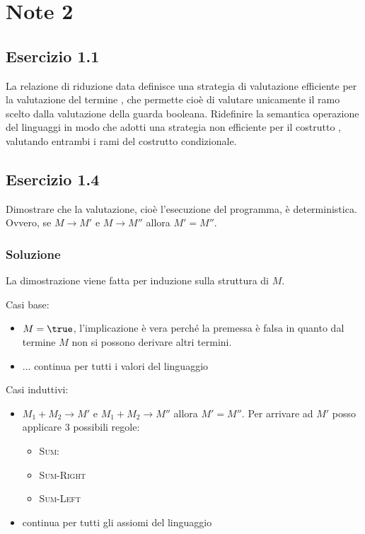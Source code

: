 
\section{Note 2}

\subsection{Esercizio 1.1}

La relazione di riduzione data definisce una strategia di valutazione efficiente per la valutazione del termine , che permette cioè di valutare unicamente il ramo scelto dalla valutazione della guarda booleana. Ridefinire la semantica operazione del linguaggi in modo che adotti una strategia non efficiente per il costrutto , valutando entrambi i rami del costrutto condizionale.

\subsection{Esercizio 1.4} \label{ex:2.1.4}

Dimostrare che la valutazione, cioè l'esecuzione del programma, è deterministica. Ovvero, se $M \rightarrow M'$ e $M \rightarrow M''$ allora $M' = M''$.

\subsubsection{Soluzione}

La dimostrazione viene fatta per induzione sulla struttura di $M$.

\noindent Casi base:
\begin{itemize}
	\item $M = \true$, l'implicazione è vera perché la premessa è falsa in quanto dal termine $M$ non si possono derivare altri termini.
	\item ... continua per tutti i valori del linguaggio 
\end{itemize}

\noindent Casi induttivi:
\begin{itemize}
	\item $M_1 + M_2 \rightarrow M'$ e $M_1 + M_2 \rightarrow M''$ allora $M' = M''$. Per arrivare ad $M'$ posso applicare 3 possibili regole:
	\begin{itemize}
		\item \textsc{Sum}: 
		\item \textsc{Sum-Right}
		\item \textsc{Sum-Left} 
	\end{itemize}
	\item continua per tutti gli assiomi del linguaggio
\end{itemize}




